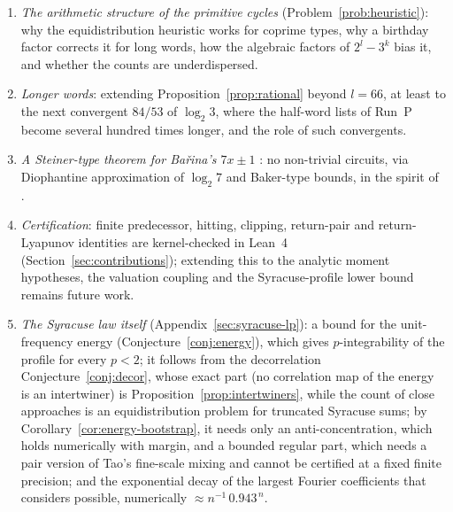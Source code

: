 \documentclass[12pt]{amsart}
\theoremstyle{definition}
\theoremstyle{remark}
\begin{document}
\begin{enumerate}[label=(\arabic*)]
	\item \emph{The arithmetic structure of the primitive cycles} (Problem~\ref{prob:heuristic}): why the equidistribution heuristic works for coprime types, why a birthday factor corrects it for long words, how the algebraic factors of $2^l-3^k$ bias it, and whether the counts are underdispersed.
	\item \emph{Longer words}: extending Proposition~\ref{prop:rational} beyond $l=66$, at least to the next convergent $84/53$ of $\log_2 3$, where the half-word lists of Run~P become several hundred times longer, and the role of such convergents.
	\item \emph{A Steiner-type theorem for Ba\v{r}ina's $7x\pm1$} \cite{Barina_2022}: no non-trivial circuits, via Diophantine approximation of $\log_2 7$ and Baker-type bounds, in the spirit of \cite{Steiner_1977,Simons_deWeger_2005}.
	\item \emph{Certification}: finite predecessor, hitting, clipping, return-pair and return-Lyapunov identities are kernel-checked in Lean~4 (Section~\ref{sec:contributions}); extending this to the analytic moment hypotheses, the valuation coupling and the Syracuse-profile lower bound remains future work.
	\item \emph{The Syracuse law itself} (Appendix~\ref{sec:syracuse-lp}): a bound for the unit-frequency energy (Conjecture~\ref{conj:energy}), which gives $p$-integrability of the profile for every $p<2$; it follows from the decorrelation Conjecture~\ref{conj:decor}, whose exact part (no correlation map of the energy is an intertwiner) is Proposition~\ref{prop:intertwiners}, while the count of close approaches is an equidistribution problem for truncated Syracuse sums; by Corollary~\ref{cor:energy-bootstrap}, it needs only an anti-concentration, which holds numerically with margin, and a bounded regular part, which needs a pair version of Tao's fine-scale mixing and cannot be certified at a fixed finite precision; and the exponential decay of the largest Fourier coefficients that \cite{Tao_2022} considers possible, numerically $\approx n^{-1}\,0.943^{\,n}$.
\end{enumerate}
\end{document}
